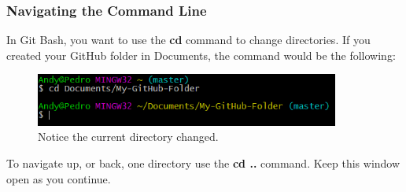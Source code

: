 \documentclass[12pt]{article}
\begin{document}
    \subsubsection{Navigating the Command Line}
    In Git Bash, you want to use the \textbf{cd} command to change directories. If you created your GitHub folder in Documents, the command would be the following:
    \begin{figure}[h!]
        \includegraphics[width=10cm, center]{Bash-cdCommand}
        \caption{Notice the current directory changed.}
    \end{figure}
    \par\bigskip 
    \noindent
    To navigate up, or back, one directory use the \textbf{cd ..} command. Keep this window open as you continue.
    
\end{document}
